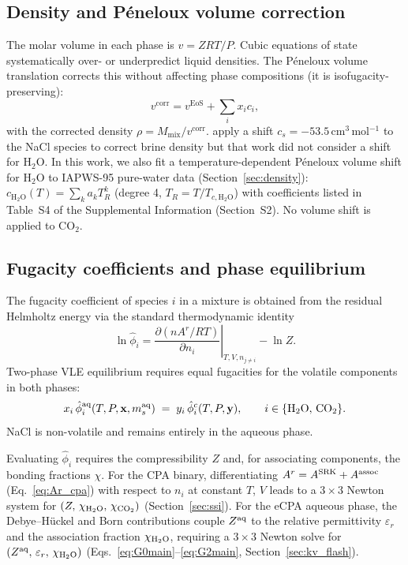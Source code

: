 \documentclass[preprint,12pt,number]{elsarticle}
\begin{document}
\subsection{Density and Péneloux volume correction}
\label{sec:peneloux}

The molar volume in each phase is $v = ZRT/P$.
Cubic equations of state systematically over- or underpredict liquid densities.
The Péneloux volume translation \citep{Peneloux1982} corrects this without affecting
phase compositions (it is isofugacity-preserving):
\begin{equation}
  v^{\text{corr}} = v^{\text{EoS}} + \sum_i x_i c_i,
  \label{eq:peneloux}
\end{equation}
with the corrected density $\rho = M_{\text{mix}}/v^{\text{corr}}$.
\citet{Coelho2025} apply a shift $c_s = -53.5$\,cm$^3$\,mol$^{-1}$ to the NaCl species
to correct brine density but that work did not consider a shift for H$_2$O.
In this work, we also fit a temperature-dependent Péneloux volume shift for H$_2$O to IAPWS-95 pure-water data (Section~\ref{sec:density}):
 $c_{\text{H}_2\text{O}}(T) = \sum_k a_k T_R^k$ (degree 4, $T_R = T/T_{c,\text{H}_2\text{O}}$) with
coefficients listed in Table~S4 of the Supplemental Information (Section~S2).
No volume shift is applied to CO$_2$.


\subsection{Fugacity coefficients and phase equilibrium}
\label{sec:fugacity}

The fugacity coefficient of species $i$ in a mixture is obtained from the residual
Helmholtz energy via the standard thermodynamic identity
\begin{equation}
  \ln\hat{\phi}_i = \left.\frac{\partial(nA^r/RT)}{\partial n_i}\right|_{T,V,n_{j\neq i}}
                   - \ln Z.
  \label{eq:lnphi}
\end{equation}
Two-phase VLE equilibrium requires equal fugacities for the volatile components
in both phases:
\begin{equation}
  x_i\,\hat{\phi}_i^{\rm aq}(T,P,\mathbf{x},m_s^{\rm aq})
  \;=\;
  y_i\,\hat{\phi}_i^{c}(T,P,\mathbf{y}),
  \qquad i \in \{\mathrm{H_2O},\,\mathrm{CO_2}\}.
  \label{eq:iso_eq}
\end{equation}
NaCl is non-volatile and remains entirely in the aqueous phase.

Evaluating $\hat{\phi}_i$ requires the compressibility $Z$ and, for associating
components, the bonding fractions $\chi$.
For the CPA binary, differentiating $A^r = A^{\rm SRK}+A^{\rm assoc}$
(Eq.~\eqref{eq:Ar_cpa}) with respect to $n_i$ at constant $T$, $V$ leads to a
$3\times 3$ Newton system for $(Z,\,\chi_{\rm H_2O},\,\chi_{\rm CO_2})$ (Section~\ref{sec:ssi}).
For the eCPA aqueous phase, the Debye--Hückel and Born contributions
couple $Z^{\rm aq}$ to the relative permittivity $\varepsilon_r$ and the
association fraction $\chi_{\rm H_2O}$, requiring a $3\times 3$ Newton solve for
$(Z^{\rm aq},\,\varepsilon_r,\,\chi_{\rm H_2O})$ (Eqs.~\eqref{eq:G0main}--\eqref{eq:G2main},
Section~\ref{sec:kv_flash}).
\end{document}
